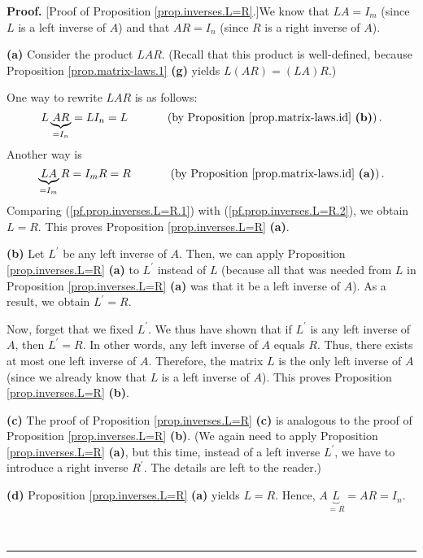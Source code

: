 \documentclass[numbers=enddot,12pt,final,onecolumn,notitlepage]{scrartcl}%
\theoremstyle{definition}
\newenvironment{proof}[1][Proof]{\noindent\textbf{#1.} }{\ \rule{0.5em}{0.5em}}
\begin{document}
\begin{proof}
[Proof of Proposition \ref{prop.inverses.L=R}.]We know that $LA=I_{m}$ (since
$L$ is a left inverse of $A$) and that $AR=I_{n}$ (since $R$ is a right
inverse of $A$).

\textbf{(a)} Consider the product $LAR$. (Recall that this product is
well-defined, because Proposition \ref{prop.matrix-laws.1} \textbf{(g)} yields
$L\left(  AR\right)  =\left(  LA\right)  R$.)

One way to rewrite $LAR$ is as follows:%
\begin{equation}
L\underbrace{AR}_{=I_{n}}=LI_{n}=L\ \ \ \ \ \ \ \ \ \ \left(  \text{by
Proposition \ref{prop.matrix-laws.id} \textbf{(b)}}\right)  .
\label{pf.prop.inverses.L=R.1}%
\end{equation}
Another way is%
\begin{equation}
\underbrace{LA}_{=I_{m}}R=I_{m}R=R\ \ \ \ \ \ \ \ \ \ \left(  \text{by
Proposition \ref{prop.matrix-laws.id} \textbf{(a)}}\right)  .
\label{pf.prop.inverses.L=R.2}%
\end{equation}
Comparing (\ref{pf.prop.inverses.L=R.1}) with (\ref{pf.prop.inverses.L=R.2}),
we obtain $L=R$. This proves Proposition \ref{prop.inverses.L=R} \textbf{(a)}.

\textbf{(b)} Let $L^{\prime}$ be any left inverse of $A$. Then, we can apply
Proposition \ref{prop.inverses.L=R} \textbf{(a)} to $L^{\prime}$ instead of
$L$ (because all that was needed from $L$ in Proposition
\ref{prop.inverses.L=R} \textbf{(a)} was that it be a left inverse of $A$). As
a result, we obtain $L^{\prime}=R$.

Now, forget that we fixed $L^{\prime}$. We thus have shown that if $L^{\prime
}$ is any left inverse of $A$, then $L^{\prime}=R$. In other words, any left
inverse of $A$ equals $R$. Thus, there exists at most one left inverse of $A$.
Therefore, the matrix $L$ is the only left inverse of $A$ (since we already
know that $L$ is a left inverse of $A$). This proves Proposition
\ref{prop.inverses.L=R} \textbf{(b)}.

\textbf{(c)} The proof of Proposition \ref{prop.inverses.L=R} \textbf{(c)} is
analogous to the proof of Proposition \ref{prop.inverses.L=R} \textbf{(b)}.
(We again need to apply Proposition \ref{prop.inverses.L=R} \textbf{(a)}, but
this time, instead of a left inverse $L^{\prime}$, we have to introduce a
right inverse $R^{\prime}$. The details are left to the reader.)

\textbf{(d)} Proposition \ref{prop.inverses.L=R} \textbf{(a)} yields $L=R$.
Hence, $A\underbrace{L}_{=R}=AR=I_{n}$.


\end{proof}
\end{document}

